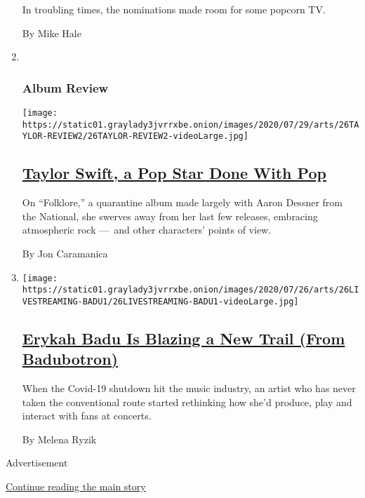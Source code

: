 \begin{enumerate}
  In troubling times, the nominations made room for some popcorn TV.

  By Mike Hale
\item ~
  \hypertarget{album-review}{%
  \subsubsection{Album Review}\label{album-review}}

  \texttt{[image: https://static01.graylady3jvrrxbe.onion/images/2020/07/29/arts/26TAYLOR-REVIEW2/26TAYLOR-REVIEW2-videoLarge.jpg]}

  \hypertarget{taylor-swift-a-pop-star-done-with-pop}{%
  \subsection{\texorpdfstring{\href{/2020/07/26/arts/music/taylor-swift-folklore-review.html}{Taylor
  Swift, a Pop Star Done With
  Pop}}{Taylor Swift, a Pop Star Done With Pop}}\label{taylor-swift-a-pop-star-done-with-pop}}

  On ``Folklore,'' a quarantine album made largely with Aaron Dessner
  from the National, she swerves away from her last few releases,
  embracing atmospheric rock ---~and other characters' points of view.

  By Jon Caramanica
\item
  \texttt{[image: https://static01.graylady3jvrrxbe.onion/images/2020/07/26/arts/26LIVESTREAMING-BADU1/26LIVESTREAMING-BADU1-videoLarge.jpg]}

  \hypertarget{erykah-badu-is-blazing-a-new-trail-from-badubotron}{%
  \subsection{\texorpdfstring{\href{/2020/07/21/arts/music/erykah-badu-livestreams.html}{Erykah
  Badu Is Blazing a New Trail (From
  Badubotron)}}{Erykah Badu Is Blazing a New Trail (From Badubotron)}}\label{erykah-badu-is-blazing-a-new-trail-from-badubotron}}

  When the Covid-19 shutdown hit the music industry, an artist who has
  never taken the conventional route started rethinking how she'd
  produce, play and interact with fans at concerts.

  By Melena Ryzik
\end{enumerate}

Advertisement

\protect\hyperlink{after-mid1}{Continue reading the main story}


